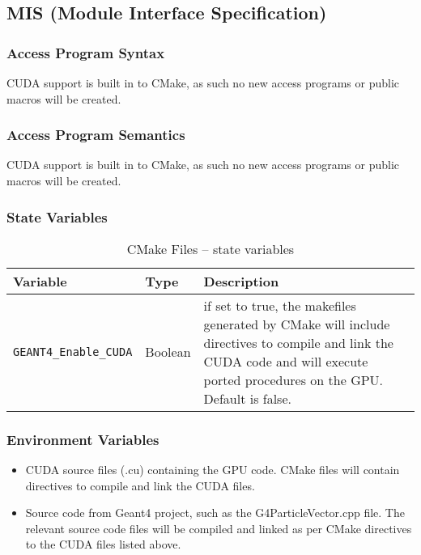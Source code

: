 \documentclass[12pt]{article}
\begin{document}
\subsection{MIS (Module Interface Specification)}
\subsubsection{Access Program Syntax}%
CUDA support is built in to CMake, as such no new access programs or public macros will be created.

\subsubsection{Access Program Semantics}%
CUDA support is built in to CMake, as such no new access programs or public macros will be created.

\subsubsection{State Variables}%
\begin{table}[h]
\caption{CMake Files -- state variables}\label{Table_CMakeStateVariables}
\begin{tabularx}{\textwidth}{p{}p{}p{}}
\toprule
\bf Variable & \bf Type & \bf Description\\\midrule
\texttt{GEANT4\_Enable\_CUDA} & Boolean & if set to true, the makefiles generated by CMake will include directives to compile and link the CUDA code and will execute ported procedures on the GPU. Default is false.\\
\bottomrule
\end{tabularx}
\end{table}

\subsubsection{Environment Variables}%
\begin{itemize}
\item CUDA source files (.cu) containing the GPU code. CMake files will contain directives to compile and link the CUDA files.
\item Source code from Geant4 project, such as the G4ParticleVector.cpp file. The relevant source code files will be compiled and linked as per CMake directives to the CUDA files listed above.
\end{itemize}
\end{document}
